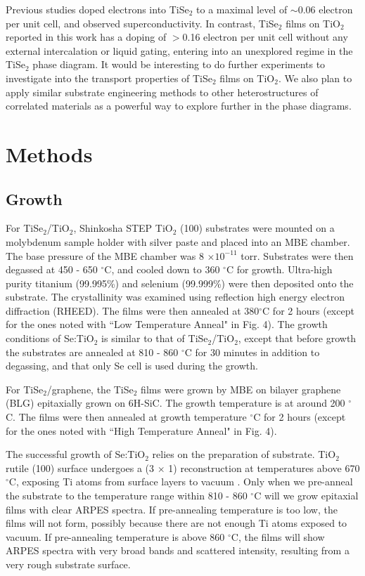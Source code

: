 \documentclass[journal=nalefd,manuscript=letter]{achemso}
\begin{document}
Previous studies doped electrons into TiSe$_2$ to a maximal level of $\sim$0.06 electron per unit cell, and observed superconductivity\cite{Morosan2006,ZhaoFeng07prl,QianHasan2007prl}. 
In contrast, TiSe$_2$ films on TiO$_2$ reported in this work has a doping of $>$0.16 electron per unit cell without any external intercalation or liquid gating, entering into an unexplored regime in the TiSe$_2$ phase diagram. 
It would be interesting to do further experiments to investigate into the transport properties of TiSe$_2$ films on TiO$_2$.
We also plan to apply similar substrate engineering methods to other heterostructures of correlated materials as a powerful way to explore further in the phase diagrams.
\section*{Methods}
\subsection*{Growth}
For TiSe$_2$/TiO$_2$, Shinkosha STEP TiO$_2$ (100) substrates were mounted on a molybdenum sample holder with silver paste and placed into an MBE chamber. The base pressure of the MBE chamber was 8 $\times 10^{-11}$ torr.
Substrates were then degassed at 450 - 650 $^\circ$C, and cooled down to 360 $^\circ$C for growth.
Ultra-high purity titanium (99.995\%) and selenium (99.999\%) were then deposited onto the substrate.
The crystallinity was examined using reflection high energy electron diffraction (RHEED).
The films were then annealed at 380$^\circ$C for 2 hours (except for the ones noted with ``Low Temperature Anneal" in Fig. 4).
The growth conditions of Se:TiO$_2$ is similar to that of TiSe$_2$/TiO$_2$, except that before growth the substrates are  annealed at 810 - 860 $^\circ$C for 30 minutes in addition to degassing, and that only Se cell is used during the growth.

For TiSe$_2$/graphene, the TiSe$_2$ films were grown by MBE on bilayer graphene (BLG) epitaxially grown on 6H-SiC\cite{BLG}. The growth temperature is at around 200 $^\circ$C. The films were then annealed at growth temperature $^\circ$C for 2 hours (except for the ones noted with ``High Temperature Anneal" in Fig. 4).

The successful growth of Se:TiO$_2$ relies on the preparation of substrate.
TiO$_2$ rutile (100) surface undergoes a (3 $\times$ 1) reconstruction at temperatures above 670 $^\circ$C, exposing Ti atoms from surface layers to vacuum \cite{DieboldTiO2}. 
Only when we pre-anneal the substrate to the temperature range within 810 - 860 $^\circ$C will we grow epitaxial films with clear ARPES spectra.
If pre-annealing temperature is too low, the films will not form, possibly because there are not enough Ti atoms exposed to vacuum.
If pre-annealing temperature is above 860 $^\circ$C, the films will show ARPES spectra with very broad bands and scattered intensity, resulting from a very rough substrate surface.
\end{document}
